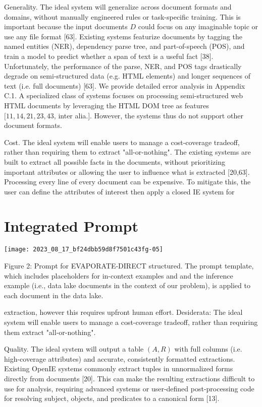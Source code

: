 \documentclass[10pt]{article}
\begin{document}
Generality. The ideal system will generalize across document formats and domains, without manually engineered rules or task-specific training. This is important because the input documents $D$ could focus on any imaginable topic or use any file format [63]. Existing systems featurize documents by tagging the named entities (NER), dependency parse tree, and part-of-speech (POS), and train a model to predict whether a span of text is a useful fact [38]. Unfortunately, the performance of the parse, NER, and POS tags drastically degrade on semi-structured data (e.g. HTML elements) and longer sequences of text (i.e. full documents) [63]. We provide detailed error analysis in Appendix C.1. A specialized class of systems focuses on processing semi-structured web HTML documents by leveraging the HTML DOM tree as features $[11,14,21,23,43$, inter alia.]. However, the systems thus do not support other document formats.

Cost. The ideal system will enable users to manage a cost-coverage tradeoff, rather than requiring them to extract "all-or-nothing". The existing systems are built to extract all possible facts in the documents, without prioritizing important attributes or allowing the user to influence what is extracted [20,63]. Processing every line of every document can be expensive. To mitigate this, the user can define the attributes of interest then apply a closed IE system for

\section{Integrated Prompt}
\begin{center}
\texttt{[image: 2023\_08\_17\_bf24dbb59d8f7501c43fg-05]}
\end{center}

Figure 2: Prompt for EVAPORATE-DIRECT structured. The prompt template, which includes placeholders for in-context examples and and the inference example (i.e., data lake documents in the context of our problem), is applied to each document in the data lake.

extraction, however this requires upfront human effort. Desiderata: The ideal system will enable users to manage a cost-coverage tradeoff, rather than requiring them extract "all-or-nothing".

Quality. The ideal system will output a table $(A, R)$ with full columns (i.e. high-coverage attributes) and accurate, consistently formatted extractions. Existing OpenIE systems commonly extract tuples in unnormalized forms directly from documents [20]. This can make the resulting extractions difficult to use for analysis, requiring advanced systems or user-defined post-processing code for resolving subject, objects, and predicates to a canonical form [13].
\end{document}
